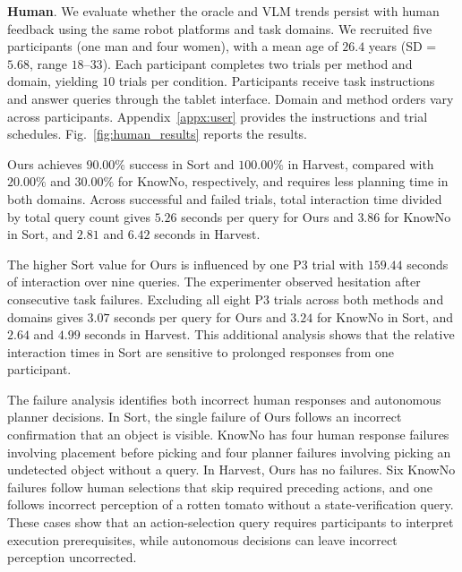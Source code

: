 






\vspace{10pt}
\noindent\textbf{Human}\label{exp:human_eval}. 
We evaluate whether the oracle and VLM trends persist with human feedback using the same robot platforms and task domains. We recruited five participants (one man and four women), with a mean age of $26.4$ years (SD = $5.68$, range $18$--$33$). Each participant completes two trials per method and domain, yielding $10$ trials per condition. Participants receive task instructions and answer queries through the tablet interface. Domain and method orders vary across participants. Appendix~\ref{appx:user} provides the instructions and trial schedules. Fig.~\ref{fig:human_results} reports the results.


Ours achieves $90.00\%$ success in Sort and $100.00\%$ in Harvest, compared with $20.00\%$ and $30.00\%$ for KnowNo, respectively, and requires less planning time in both domains. Across successful and failed trials, total interaction time divided by total query count gives $5.26$ seconds per query for Ours and $3.86$ for KnowNo in Sort, and $2.81$ and $6.42$ seconds in Harvest.


The higher Sort value for Ours is influenced by one P3 trial with $159.44$ seconds of interaction over nine queries. The experimenter observed hesitation after consecutive task failures. Excluding all eight P3 trials across both methods and domains gives $3.07$ seconds per query for Ours and $3.24$ for KnowNo in Sort, and $2.64$ and $4.99$ seconds in Harvest. This additional analysis shows that the relative interaction times in Sort are sensitive to prolonged responses from one participant.


The failure analysis identifies both incorrect human responses and autonomous planner decisions. In Sort, the single failure of Ours follows an incorrect confirmation that an object is visible. KnowNo has four human response failures involving placement before picking and four planner failures involving picking an undetected object without a query. In Harvest, Ours has no failures. Six KnowNo failures follow human selections that skip required preceding actions, and one follows incorrect perception of a rotten tomato without a state-verification query. These cases show that an action-selection query requires participants to interpret execution prerequisites, while autonomous decisions can leave incorrect perception uncorrected.


